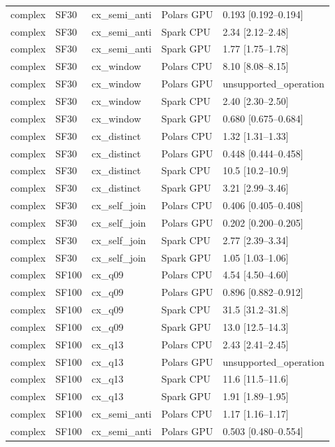 \begin{longtable}{lllll}
complex & SF30 & cx\_semi\_anti & Polars GPU & 0.193 [0.192--0.194] \\
complex & SF30 & cx\_semi\_anti & Spark CPU & 2.34 [2.12--2.48] \\
complex & SF30 & cx\_semi\_anti & Spark GPU & 1.77 [1.75--1.78] \\
complex & SF30 & cx\_window & Polars CPU & 8.10 [8.08--8.15] \\
complex & SF30 & cx\_window & Polars GPU & unsupported\_operation \\
complex & SF30 & cx\_window & Spark CPU & 2.40 [2.30--2.50] \\
complex & SF30 & cx\_window & Spark GPU & 0.680 [0.675--0.684] \\
complex & SF30 & cx\_distinct & Polars CPU & 1.32 [1.31--1.33] \\
complex & SF30 & cx\_distinct & Polars GPU & 0.448 [0.444--0.458] \\
complex & SF30 & cx\_distinct & Spark CPU & 10.5 [10.2--10.9] \\
complex & SF30 & cx\_distinct & Spark GPU & 3.21 [2.99--3.46] \\
complex & SF30 & cx\_self\_join & Polars CPU & 0.406 [0.405--0.408] \\
complex & SF30 & cx\_self\_join & Polars GPU & 0.202 [0.200--0.205] \\
complex & SF30 & cx\_self\_join & Spark CPU & 2.77 [2.39--3.34] \\
complex & SF30 & cx\_self\_join & Spark GPU & 1.05 [1.03--1.06] \\
complex & SF100 & cx\_q09 & Polars CPU & 4.54 [4.50--4.60] \\
complex & SF100 & cx\_q09 & Polars GPU & 0.896 [0.882--0.912] \\
complex & SF100 & cx\_q09 & Spark CPU & 31.5 [31.2--31.8] \\
complex & SF100 & cx\_q09 & Spark GPU & 13.0 [12.5--14.3] \\
complex & SF100 & cx\_q13 & Polars CPU & 2.43 [2.41--2.45] \\
complex & SF100 & cx\_q13 & Polars GPU & unsupported\_operation \\
complex & SF100 & cx\_q13 & Spark CPU & 11.6 [11.5--11.6] \\
complex & SF100 & cx\_q13 & Spark GPU & 1.91 [1.89--1.95] \\
complex & SF100 & cx\_semi\_anti & Polars CPU & 1.17 [1.16--1.17] \\
complex & SF100 & cx\_semi\_anti & Polars GPU & 0.503 [0.480--0.554] \\

\end{longtable}
